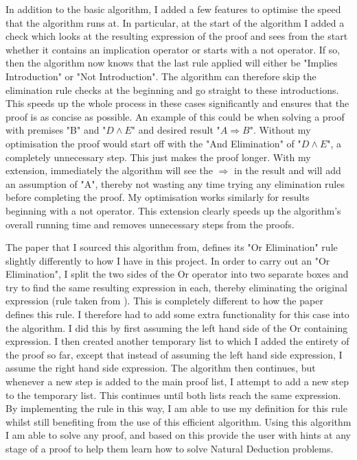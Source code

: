In addition to the basic algorithm, I added a few features to optimise the speed that the algorithm runs at. In particular, at the start of the algorithm I added a check which looks at the resulting expression of the proof and sees from the start whether it contains an implication operator or starts with a not operator. If so, then the algorithm now knows that the last rule applied will either be "Implies Introduction" or "Not Introduction". The algorithm can therefore skip the elimination rule checks at the beginning and go straight to these introductions. This speeds up the whole process in these cases significantly and ensures that the proof is as concise as possible. An example of this could be when solving a proof with premises "B" and "$D \wedge E$" and desired result "$A \Rightarrow B$". Without my optimisation the proof would start off with the "And Elimination" of "$D \wedge E$", a completely unnecessary step. This just makes the proof longer. With my extension, immediately the algorithm will see the $\Rightarrow$ in the result and will add an assumption of "A", thereby not wasting any time trying any elimination rules before completing the proof. My optimisation works similarly for results beginning with a not operator. This extension clearly speeds up the algorithm's overall running time and removes unnecessary steps from the proofs.

 The paper that I sourced this algorithm from, defines its "Or Elimination" rule slightly differently to how I have in this project. In order to carry out an "Or Elimination", I split the two sides of the Or operator into two separate boxes and try to find the same resulting expression in each, thereby eliminating the original expression (rule taken from \cite{ndBook}). This is completely different to how the paper defines this rule. I therefore had to add some extra functionality for this case into the algorithm. I did this by first assuming the left hand side of the Or containing expression. I then created another temporary list to which I added the entirety of the proof so far, except that instead of assuming the left hand side expression, I assume the right hand side expression. The algorithm then continues, but whenever a new step is added to the main proof list, I attempt to add a new step to the temporary list. This continues until both lists reach the same expression. By implementing the rule in this way, I am able to use my definition for this rule whilst still benefiting from the use of this efficient algorithm. Using this algorithm I am able to solve any proof, and based on this provide the user with hints at any stage of a proof to help them learn how to solve Natural Deduction problems. 

